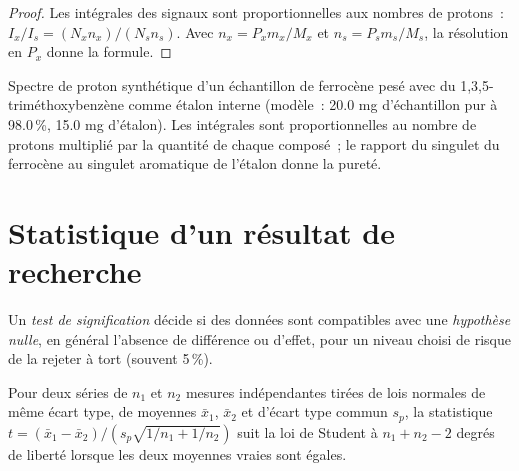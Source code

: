 \begin{proof}
Les intégrales des signaux sont proportionnelles aux nombres de protons~: $I_x/I_s = (N_xn_x)/(N_sn_s)$. Avec
$n_x = P_xm_x/M_x$ et $n_s = P_sm_s/M_s$, la résolution en $P_x$ donne la formule.
\end{proof}

\begin{omfigure}

{\small Spectre de proton synthétique d'un échantillon de ferrocène pesé
avec du 1,3,5-triméthoxybenzène comme étalon interne (modèle~: 20.0 mg
d'échantillon pur à 98.0\,\%, 15.0 mg d'étalon). Les intégrales sont
proportionnelles au nombre de protons multiplié par la quantité de chaque
composé~; le rapport du singulet du ferrocène au singulet aromatique de
l'étalon donne la pureté.}
\end{omfigure}

\section{Statistique d'un résultat de recherche}

\begin{definition}\label{def:b3:lab-techniques-3:tests}
Un \emph{test de signification} décide si des
données sont compatibles avec une \emph{hypothèse nulle}, en général
l'absence de différence ou d'effet, pour un niveau choisi de risque de la
rejeter à tort (souvent 5\,\%).
\end{definition}

\begin{theorem}\label{thm:b3:lab-techniques-3:t-test}
Pour deux séries de $n_1$ et $n_2$ mesures indépendantes tirées de lois normales
de même écart type, de moyennes $\bar x_1$, $\bar x_2$ et d'écart type
commun $s_p$, la statistique $t = (\bar x_1 - \bar x_2)/(s_p\sqrt{1/n_1 + 1/n_2})$ suit la loi de Student à
$n_1 + n_2 - 2$ degrés de liberté lorsque les deux moyennes vraies sont égales. \admitted
\end{theorem}

